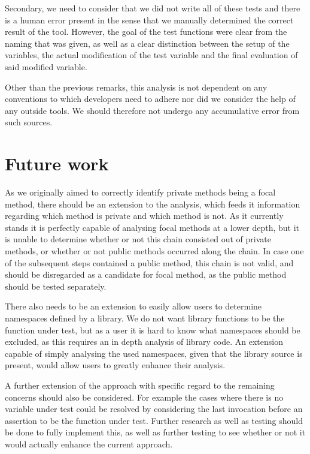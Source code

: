 \documentclass[11pt]{article}
\begin{document}
\begin{multicols}{2}
Secondary, we need to consider that we did not write all of these tests and there is a human error present in the sense that we manually determined the correct result of the tool. However, the goal of the test functions were clear from the naming that was given, as well as a clear distinction between the setup of the variables, the actual modification of the test variable and the final evaluation of said modified variable.

Other than the previous remarks, this analysis is not dependent on any conventions to which developers need to adhere nor did we consider the help of any outside tools. We should therefore not undergo any accumulative error from such sources.

\section{Future work}
As we originally aimed to correctly identify private methods being a focal method, there should be an extension to the analysis, which feeds it information regarding which method is private and which method is not. As it currently stands it is perfectly capable of analysing focal methods at a lower depth, but it is unable to determine whether or not this chain consisted out of private methods, or whether or not public methods occurred along the chain. In case one of the subsequent steps contained a public method, this chain is not valid, and should be disregarded as a candidate for focal method, as the public method should be tested separately.

There also needs to be an extension to easily allow users to determine namespaces defined by a library. We do not want library functions to be the function under test, but as a user it is hard to know what namespaces should be excluded, as this requires an in depth analysis of library code. An extension capable of simply analysing the used namespaces, given that the library source is present, would allow users to greatly enhance their analysis.

A further extension of the approach with specific regard to the remaining concerns should also be considered. For example the cases where there is no variable under test could be resolved by considering the last invocation before an assertion to be the function under test. Further research as well as testing should be done to fully implement this, as well as further testing to see whether or not it would actually enhance the current approach.


\end{multicols}
\end{document}
